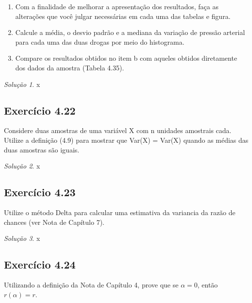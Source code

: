 \documentclass[
]{latex/krantz}
\providecommand{\tightlist}{%
  \setlength{\itemsep}{0pt}\setlength{\parskip}{0pt}}
\theoremstyle{definition}
\theoremstyle{definition}
\theoremstyle{definition}
\theoremstyle{definition}
\theoremstyle{remark}
\newtheorem*{solution}{Solução}
\begin{document}
\begin{enumerate}
\def\labelenumi{\alph{enumi}.}
\tightlist
\item
  Com a finalidade de melhorar a apresentação dos resultados, faça as alterações que você julgar necessárias em cada uma das tabelas e figura.
\item
  Calcule a média, o desvio padrão e a mediana da variação de pressão arterial para cada uma das duas drogas por meio do histograma.
\item
  Compare os resultados obtidos no item b com aqueles obtidos diretamente dos dados da amostra (Tabela 4.35).
\end{enumerate}

\begin{solution}
x
\end{solution}

\hypertarget{exr4-22}{%
\subsection*{Exercício 4.22}\label{exr4-22}}

Considere duas amostras de uma variável X com n unidades amostrais cada. Utilize a definição (4.9) para mostrar que Var(X) = Var(X) quando as médias das duas amostras são iguais.

\begin{solution}
x
\end{solution}

\hypertarget{exr4-23}{%
\subsection*{Exercício 4.23}\label{exr4-23}}

Utilize o método Delta para calcular uma estimativa da variancia da razão de chances (ver Nota de Capítulo 7).

\begin{solution}
x
\end{solution}

\hypertarget{exr4-24}{%
\subsection*{Exercício 4.24}\label{exr4-24}}

Utilizando a definição da Nota de Capítulo 4, prove que se \(\alpha = 0\), então \(r(\alpha) = r\).
\end{document}
